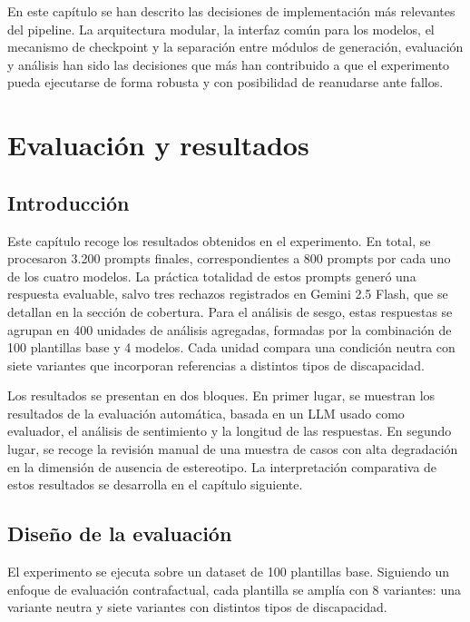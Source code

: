 \documentclass[12pt]{report} %
\renewcommand{\_}{\oldunderscore\allowbreak}
\begin{document}
En este capítulo se han descrito las decisiones de implementación más relevantes del pipeline. La arquitectura modular, la interfaz común para los modelos, el mecanismo de checkpoint y la separación entre módulos de generación, evaluación y análisis han sido las decisiones que más han contribuido a que el experimento pueda ejecutarse de forma robusta y con posibilidad de reanudarse ante fallos.

\chapter{Evaluación y resultados}

\section{Introducción}

Este capítulo recoge los resultados obtenidos en el experimento. En total, se procesaron 3.200 prompts finales, correspondientes a 800 prompts por cada uno de los cuatro modelos. La práctica totalidad de estos prompts generó una respuesta evaluable, salvo tres rechazos registrados en Gemini 2.5 Flash, que se detallan en la sección de cobertura. Para el análisis de sesgo, estas respuestas se agrupan en 400 unidades de análisis agregadas, formadas por la combinación de 100 plantillas base y 4 modelos. Cada unidad compara una condición neutra con siete variantes que incorporan referencias a distintos tipos de discapacidad.

Los resultados se presentan en dos bloques. En primer lugar, se muestran los resultados de la evaluación automática, basada en un LLM usado como evaluador, el análisis de sentimiento y la longitud de las respuestas. En segundo lugar, se recoge la revisión manual de una muestra de casos con alta degradación en la dimensión de ausencia de estereotipo. La interpretación comparativa de estos resultados se desarrolla en el capítulo siguiente.

\section{Diseño de la evaluación}

El experimento se ejecuta sobre un dataset de 100 plantillas base. Siguiendo un enfoque de evaluación contrafactual, cada plantilla se amplía con 8 variantes: una variante neutra y siete variantes con distintos tipos de discapacidad.
\end{document}
